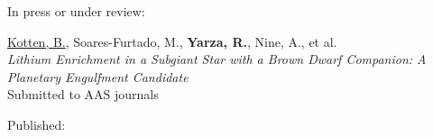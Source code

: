 \ifdefined\withunpublished{}
In press or under review:
\begin{etaremune}
\item \underline{Kotten, B.}, Soares-Furtado, M., \textbf{Yarza, R.}, Nine, A., et al.\\\textit{Lithium Enrichment in a Subgiant Star with a Brown Dwarf Companion: A Planetary Engulfment Candidate}\\Submitted to AAS journals

\end{etaremune}
Published:
\else\fi
\begin{etaremune}

\end{etaremune}
